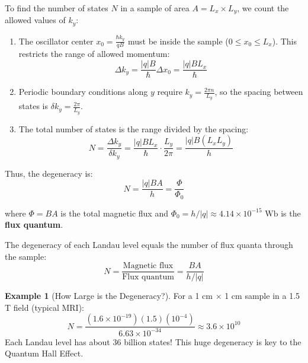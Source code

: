 \documentclass[11pt,a4paper]{article}
\theoremstyle{definition}
\newtheorem{example}{Example}[section]
\theoremstyle{remark}
\begin{document}
To find the number of states $N$ in a sample of area $A = L_x \times L_y$, we count the allowed values of $k_y$:

\begin{enumerate}
    \item The oscillator center $x_0 = \frac{\hbar k_y}{qB}$ must be inside the sample ($0 \le x_0 \le L_x$). This restricts the range of allowed momentum:
    \begin{equation}
        \Delta k_y = \frac{|q|B}{\hbar} \Delta x_0 = \frac{|q|B L_x}{\hbar}
    \end{equation}
    \item Periodic boundary conditions along $y$ require $k_y = \frac{2\pi n}{L_y}$, so the spacing between states is $\delta k_y = \frac{2\pi}{L_y}$.
    \item The total number of states is the range divided by the spacing:
    \begin{equation}
        N = \frac{\Delta k_y}{\delta k_y} = \frac{|q|B L_x}{\hbar} \cdot \frac{L_y}{2\pi} = \frac{|q|B (L_x L_y)}{h}
    \end{equation}
\end{enumerate}

Thus, the degeneracy is:
\begin{equation}
    N = \frac{|q|BA}{h} = \frac{\Phi}{\Phi_0}
\end{equation}

where $\Phi = BA$ is the total magnetic flux and $\Phi_0 = h/|q| \approx 4.14 \times 10^{-15} \text{ Wb}$ is the \textbf{flux quantum}.

\begin{keyresult}
The degeneracy of each Landau level equals the number of flux quanta through the sample:
\begin{equation}
    \boxed{N = \frac{\text{Magnetic flux}}{\text{Flux quantum}} = \frac{BA}{h/|q|}}
\end{equation}
\end{keyresult}

\begin{example}[How Large is the Degeneracy?]
For a 1 cm $\times$ 1 cm sample in a 1.5 T field (typical MRI):
\begin{equation}
    N = \frac{(1.6 \times 10^{-19})(1.5)(10^{-4})}{6.63 \times 10^{-34}} \approx 3.6 \times 10^{10}
\end{equation}
Each Landau level has about 36 billion states! This huge degeneracy is key to the Quantum Hall Effect.
\end{example}
\end{document}
